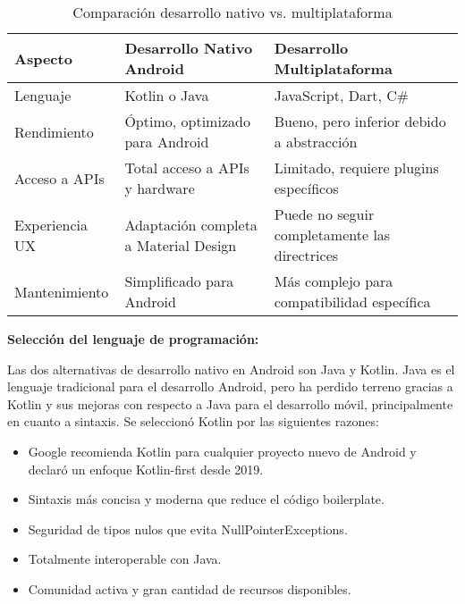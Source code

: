 \begin{table}[H]
\centering
\caption{Comparación desarrollo nativo vs. multiplataforma}
\begin{tabular}{|p{}|p{}|p{}|}
\hline
\textbf{Aspecto} & \textbf{Desarrollo Nativo Android} & \textbf{Desarrollo Multiplataforma} \\
\hline
Lenguaje & Kotlin o Java & JavaScript, Dart, C\# \\
\hline
Rendimiento & Óptimo, optimizado para Android & Bueno, pero inferior debido a abstracción \\
\hline
Acceso a APIs & Total acceso a APIs y hardware & Limitado, requiere plugins específicos \\
\hline
Experiencia UX & Adaptación completa a Material Design & Puede no seguir completamente las directrices \\
\hline
Mantenimiento & Simplificado para Android & Más complejo para compatibilidad específica \\
\hline
\end{tabular}
\end{table}

\textbf{Selección del lenguaje de programación:}

Las dos alternativas de desarrollo nativo en Android son Java y Kotlin. Java es el lenguaje tradicional para el desarrollo Android, pero ha perdido terreno gracias a Kotlin y sus mejoras con respecto a Java para el desarrollo móvil, principalmente en cuanto a sintaxis. Se seleccionó Kotlin por las siguientes razones:

\begin{itemize}
    \item Google recomienda Kotlin para cualquier proyecto nuevo de Android y declaró un enfoque Kotlin-first desde 2019.
    \item Sintaxis más concisa y moderna que reduce el código boilerplate.
    \item Seguridad de tipos nulos que evita NullPointerExceptions.
    \item Totalmente interoperable con Java.
    \item Comunidad activa y gran cantidad de recursos disponibles.
\end{itemize}

